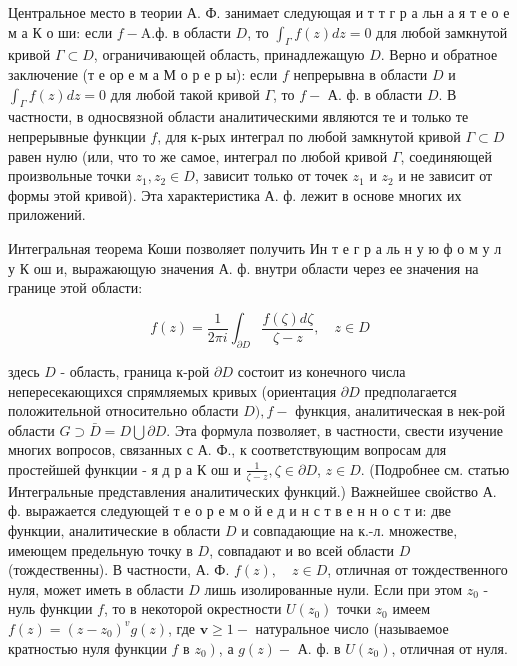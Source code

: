 \documentclass[10pt]{article}
\begin{document}
Центральное место в теории А. Ф. занимает следующая и т т г р а льн а я т е о е м а К о ши: если $f-\mathrm{A} . ф$. в области $D$, то $\int_{\Gamma} f(z) d z=0$ для любой замкнутой кривой $\Gamma \subset D$, ограничивающей область, принадлежащую $D$. Верно и обратное заключение (т е ор е м а М о р е р ы): если $f$ непрерывна в области $D$ и $\int_{\Gamma} f(z) d z=0$ для любой такой кривой $\Gamma$, то $f-$ А. ф. в области $D$. В частности, в односвязной области аналитическими являются те и только те непрерывные функции $f$, для к-рых интеграл по любой замкнутой кривой $\Gamma \subset D$ равен нулю (или, что то же самое, интеграл по любой кривой $\Gamma$, соединяющей произвольные точки $z_{1}, z_{2} \in D$, зависит только от точек $z_{1}$ и $z_{2}$ и не зависит от формы этой кривой). Эта характеристика А. ф. лежит в основе многих их приложений.



Интегральная теорема Коши позволяет получить Ин т е г р а ль н у ю ф о м у л у К ош и, выражающую значения А. ф. внутри области через ее значения на границе этой области:



\[

f(z)=\frac{1}{2 \pi i} \int_{\partial D} \frac{f(\zeta) d \zeta}{\zeta-z}, \quad z \in D

\]



здесь $D$ - область, граница к-рой $\partial D$ состоит из конечного числа непересекающихся спрямляемых кривых (ориентация $\partial D$ предполагается положительной относительно области $D), f-$ функция, аналитическая в нек-рой области $G \supset \bar{D}=D \bigcup \partial D$. Эта формула позволяет, в частности, свести изучение многих вопросов, связанных с А. Ф., к соответствующим вопросам для простейшей функции - я д р а $К$ ош и $\frac{1}{\zeta-z}, \zeta \in \partial D$, $z \in D$. (Подробнее см. статью Интегральные представления аналитических функций.) Важнейшее свойство А. ф. выражается следующей т е о р е м о й е д и н с т в е н н о с т и: две функции, аналитические в области $D$ и совпадающие на к.-л. множестве, имеющем предельную точку в $D$, совпадают и во всей области $D$ (тождественны). В частности, А. Ф. $f(z), \quad z \in D$, отличная от тождественного нуля, может иметь в области $D$ лишь изолированные нули. Если при этом $z_{0}$ - нуль функции $f$, то в некоторой окрестности $U\left(z_{0}\right)$ точки $z_{0}$ имеем $f(z)=\left(z-z_{0}\right)^{v} g(z)$, где $\boldsymbol{v} \geqslant 1-$ натуральное число (называемое кратностью нуля функции $f$ в $\left.z_{0}\right)$, а $g(z)-$ А. ф. в $U\left(z_{0}\right)$, отличная от нуля.
\end{document}
